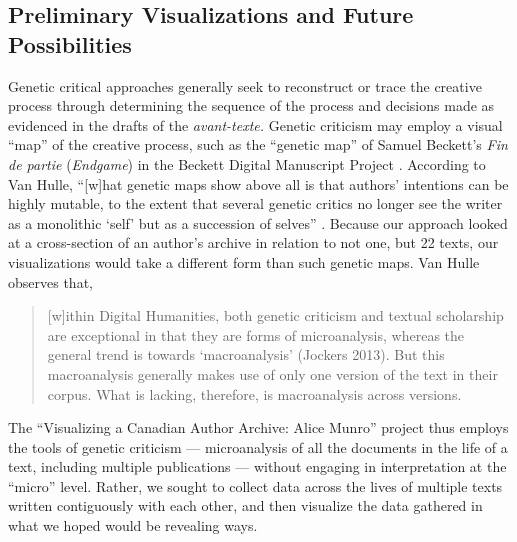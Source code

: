 \documentclass{article}
\begin{document}
\subsection*{Preliminary Visualizations and Future Possibilities}

Genetic critical approaches generally seek to reconstruct or trace the
creative process through determining the sequence of the process and
decisions made as evidenced in the drafts of the \emph{avant-texte.}
Genetic criticism may employ a visual ``map'' of the creative process,
such as the ``genetic map'' of Samuel Beckett's \emph{Fin de partie}
(\emph{Endgame}) in the Beckett Digital Manuscript Project \citep[11]{van_hulle_genetic_2022}. According to Van Hulle, ``{[}w{]}hat genetic maps show above all is
that authors' intentions can be highly mutable, to the extent that
several genetic critics no longer see the writer as a monolithic `self'
but as a succession of selves'' \citep[11]{van_hulle_genetic_2022}. Because our approach looked at a
cross-section of an author's archive in relation to not one, but 22
texts, our visualizations would take a different form than such genetic
maps. Van Hulle observes that,

\begin{quote}
{[}w{]}ithin Digital Humanities, both genetic criticism and textual
scholarship are exceptional in that they are forms of microanalysis, whereas the general trend is towards `macroanalysis' (Jockers 2013). But this macroanalysis
generally makes use of only one version of the text in their corpus. What is lacking,
therefore, is macroanalysis across versions. 

\begin{flushright}
    \parencite[176--77]{van_hulle_genetic_2022}
\end{flushright}
\end{quote}

The ``Visualizing a Canadian Author Archive: Alice Munro'' project thus
employs the tools of genetic criticism –– microanalysis of all the
documents in the life of a text, including multiple
publications –– without engaging in interpretation at the ``micro''
level. Rather, we sought to collect data across the lives of multiple
texts written contiguously with each other, and then visualize the data
gathered in what we hoped would be revealing ways.
\end{document}
